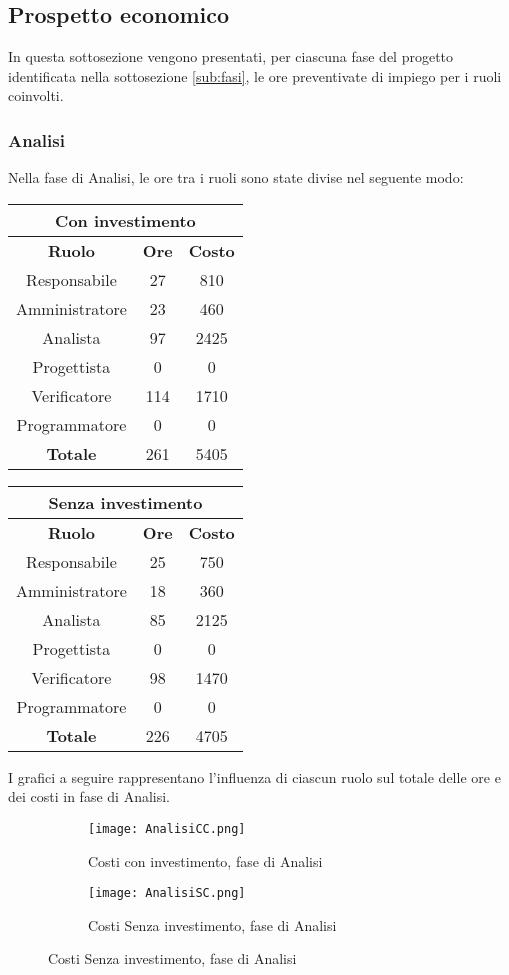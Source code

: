 \documentclass{scalatekids-article}
\begin{document}
\subsection{Prospetto economico}
In questa sottosezione vengono presentati, per ciascuna fase del progetto identificata
nella sottosezione \ref{sub:fasi}, le ore preventivate di impiego per i ruoli coinvolti.
\subsubsection{Analisi}
Nella fase di Analisi, le ore tra i ruoli sono state divise nel seguente modo:
\begin{center}
  \normalsize
  \begin{tabular}{| c | c | c |}
    \hline
    \multicolumn{3}{|c|}{\textbf{Con investimento}}\\
    \hline
    \textbf{Ruolo} & \textbf{Ore} & \textbf{Costo}\\
    \hline
    Responsabile & 27 & 810\\
    Amministratore & 23 & 460\\
    Analista & 97 & 2425\\
    Progettista & 0 & 0\\
    Verificatore & 114 & 1710 \\
    Programmatore & 0 & 0 \\
    \hline
    \textbf{Totale} & 261 & 5405\\
    \hline
  \end{tabular}
  \qquad
  \begin{tabular}{| c | c | c |}
    \hline
    \multicolumn{3}{|c|}{\textbf{Senza investimento}}\\
    \hline
    \textbf{Ruolo} & \textbf{Ore} & \textbf{Costo}\\
    \hline
    Responsabile & 25 & 750\\
    Amministratore & 18 & 360\\
    Analista & 85 & 2125\\
    Progettista & 0 & 0\\
    Verificatore & 98 & 1470 \\
    Programmatore & 0 & 0 \\
    \hline
    \textbf{Totale} & 226 & 4705\\
    \hline
  \end{tabular}
\end{center}
I grafici a seguire rappresentano l'influenza di ciascun ruolo sul totale delle ore e dei costi in fase di Analisi.
\begin{figure}[H]
  \begin{subfigure}[H]{0.47\textwidth}
    \texttt{[image: AnalisiCC.png]}
    \caption{Costi con investimento, fase di Analisi}
  \end{subfigure}
  \qquad
  \begin{subfigure}[H]{0.47\textwidth}
    \texttt{[image: AnalisiSC.png]}
    \caption{Costi Senza investimento, fase di Analisi}
  \end{subfigure}
\end{figure}
\newpage
\end{document}
